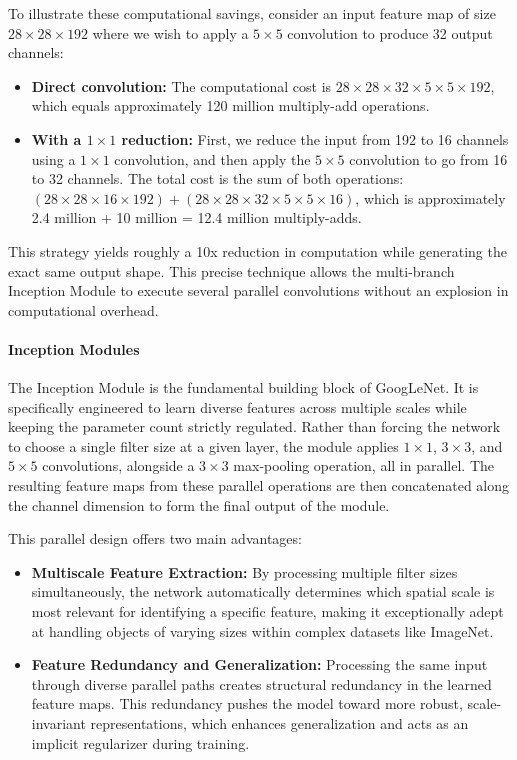 To illustrate these computational savings, consider an input feature map of size $28 \times 28 \times 192$ where we wish to apply a $5 \times 5$ convolution to produce 32 output channels:
\begin{itemize}
    \item \textbf{Direct convolution:} The computational cost is $28 \times 28 \times 32 \times 5 \times 5 \times 192$, which equals approximately 120 million multiply-add operations.
    \item \textbf{With a $1 \times 1$ reduction:} First, we reduce the input from 192 to 16 channels using a $1 \times 1$ convolution, and then apply the $5 \times 5$ convolution to go from 16 to 32 channels. The total cost is the sum of both operations: $(28 \times 28 \times 16 \times 192) + (28 \times 28 \times 32 \times 5 \times 5 \times 16)$, which is approximately 2.4 million + 10 million = 12.4 million multiply-adds.
\end{itemize}
This strategy yields roughly a 10x reduction in computation while generating the exact same output shape. This precise technique allows the multi-branch Inception Module to execute several parallel convolutions without an explosion in computational overhead.

\paragraph{Inception Modules}
The Inception Module is the fundamental building block of GoogLeNet. It is specifically engineered to learn diverse features across multiple scales while keeping the parameter count strictly regulated. Rather than forcing the network to choose a single filter size at a given layer, the module applies $1 \times 1$, $3 \times 3$, and $5 \times 5$ convolutions, alongside a $3 \times 3$ max-pooling operation, all in parallel. The resulting feature maps from these parallel operations are then concatenated along the channel dimension to form the final output of the module.

This parallel design offers two main advantages:
\begin{itemize}
    \item \textbf{Multiscale Feature Extraction:} By processing multiple filter sizes simultaneously, the network automatically determines which spatial scale is most relevant for identifying a specific feature, making it exceptionally adept at handling objects of varying sizes within complex datasets like ImageNet.
    \item \textbf{Feature Redundancy and Generalization:} Processing the same input through diverse parallel paths creates structural redundancy in the learned feature maps. This redundancy pushes the model toward more robust, scale-invariant representations, which enhances generalization and acts as an implicit regularizer during training.
\end{itemize}


